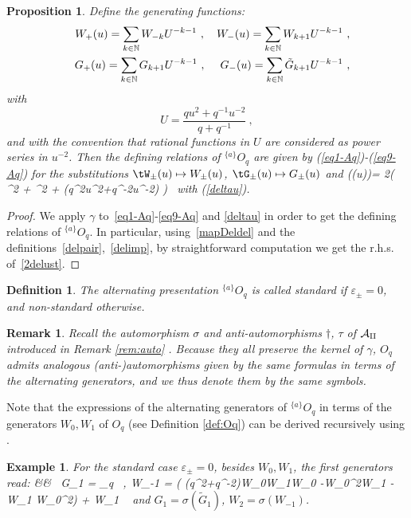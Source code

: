 \documentclass[11pt]{amsart}
\numberwithin{equation}{section}
\newtheorem{prop}[thm]{Proposition}
\newtheorem{example}[thm]{Example}
\newtheorem{defn}[thm]{Definition}
\newtheorem{rem}[thm]{Remark}
\numberwithin{equation}{section}
\begin{document}
\begin{prop}\label{def:Oqalt} 
Define the generating functions:
	\begin{align}
		{W}_+(u)=\sum_{k\in {\mathbb N}}{\normalfont W}_{-k}U^{-k-1} \ , \quad {W}_-(u)=\sum_{k\in  {\mathbb N}}{\normalfont W}_{k+1}U^{-k-1} \ ,\label{c1oq}\\
		\quad {G}_+(u)=\sum_{k\in {\mathbb N}}{\normalfont G}_{k+1}U^{-k-1} \ , \; \quad {G}_-(u)=\sum_{k\in {\mathbb N}}{\normalfont \tilde{{G}}_{k+1}}U^{-k-1} \label{c2oq} \  ,
	\end{align}
with 
$$
U=\frac{qu^2+q^{-1}u^{-2}}{q+q^{-1}}\ ,
$$
and with the convention that  rational functions in $U$ are considered  as power series in $u^{-2}$.
Then the defining relations of $^{\{a\}}O_q$ are given by (\ref{eq1-Aq})-(\ref{eq9-Aq}) for the substitutions ${\tW}_\pm(u) \mapsto W_\pm(u)$, ${\tG}_\pm(u) \mapsto G_\pm(u)$  and
	\beqa
	\gamma(\Delta(u))=  	2\left( \epsp^2 + \epsm^2 + \epsp\epsm(q^2u^2+q^{-2}u^{-2}) \right)\ \label{2delust}
	\eeqa
	with (\ref{deltau}). 
\end{prop}	
\begin{proof}
We apply $\gamma$  to~\eqref{eq1-Aq}-\eqref{eq9-Aq} and \eqref{deltau} in order to get the defining relations of $^{\{a\}}O_q$. In particular, using~\eqref{mapDeldel} and the definitions~\eqref{delpair},~\eqref{delimp},  by straightforward computation we get the r.h.s.\,of~\eqref{2delust}.
\end{proof}
\begin{defn}\label{def:stalt}
The alternating presentation $^{\{a\}}O_q$ is called standard if $\varepsilon_\pm=0$, and non-standard otherwise. 
\end{defn}
\begin{rem}\label{rem:Oq-auto}
Recall the automorphism $\sigma$ and anti-automorphisms $\dagger$, $\tau$ of $\cal A_q$ introduced in Remark \ref{rem:auto} \cite[Lems.\,11.7, 11.8, 11.9]{Ter21b}. Because they all preserve the kernel of $\gamma$, $O_q$ admits analogous (anti-)automorphisms given by the same formulas in terms of the alternating generators, and we thus denote them by the same symbols. 
\end{rem}

Note that the expressions of the alternating generators of $^{\{a\}}O_q$ in terms of the generators $W_0,W_1$ of $O_q$ (see Definition \ref{def:Oq})  can be derived recursively using \cite[Prop.\,3.1]{BasBel}.
\begin{example}\label{ex1} For the standard case $\varepsilon_\pm=0$, besides $W_0,W_1$, the first generators read:
	\beqa
	\quad && \ {\tilde G}_{1} = \big[{W_0},W_1\big]_q \ ,\qquad 
	{W}_{-1} = \left( (q^2+q^{-2})W_0W_1W_0 -W_0^2W_1 - W_1 W_0^2\right) + W_1 
	\nonumber\ 
	\eeqa
	and $G_1=\sigma(\tilde{G}_{1})$, ${W_2}=\sigma(W_{-1})$.
	\end{example}
\end{document}
